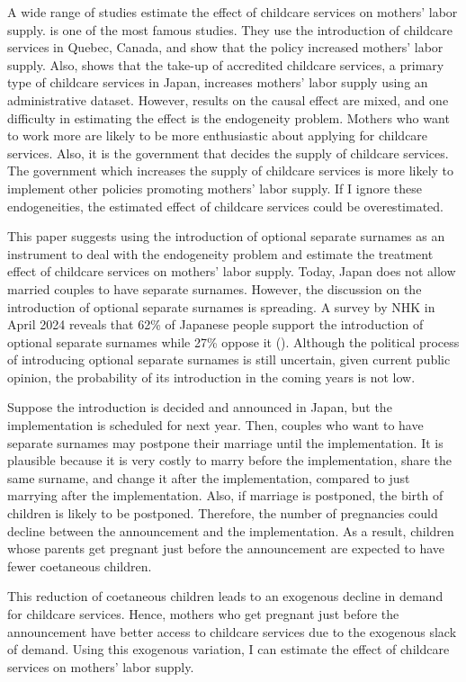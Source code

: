 \documentclass[12pt]{article}
\begin{document}
A wide range of studies estimate the effect of childcare services on mothers' labor supply.
\cite{Baker2008-vt} is one of the most famous studies. 
They use the introduction of childcare services in Quebec, Canada, and show that the policy increased mothers' labor supply.
Also, \cite{kondo2024} shows that the take-up of accredited childcare services, a primary type of childcare services in Japan, increases mothers' labor supply using an administrative dataset.
However, results on the causal effect are mixed, and one difficulty in estimating the effect is the endogeneity problem.
Mothers who want to work more are likely to be more enthusiastic about applying for childcare services.
Also, it is the government that decides the supply of childcare services. 
The government which increases the supply of childcare services is more likely to implement other policies promoting mothers' labor supply.
If I ignore these endogeneities, the estimated effect of childcare services could be overestimated.


This paper suggests using the introduction of optional separate surnames as an instrument to deal with the endogeneity problem and estimate the treatment effect of childcare services on mothers' labor supply.
Today, Japan does not allow married couples to have separate surnames.
However, the discussion on the introduction of optional separate surnames is spreading.
A survey by NHK in April 2024 reveals that 62\% of Japanese people support the introduction of optional separate surnames while 27\% oppose it (\cite{nhk}).
Although the political process of introducing optional separate surnames is still uncertain, given current public opinion, the probability of its introduction in the coming years is not low.


Suppose the introduction is decided and announced in Japan, but the implementation is scheduled for next year.
Then, couples who want to have separate surnames may postpone their marriage until the implementation. 
It is plausible because it is very costly to marry before the implementation, share the same surname, and change it after the implementation, compared to just marrying after the implementation.
Also, if marriage is postponed, the birth of children is likely to be postponed.
Therefore, the number of pregnancies could decline between the announcement and the implementation.
As a result, children whose parents get pregnant just before the announcement are expected to have fewer coetaneous children.


This reduction of coetaneous children leads to an exogenous decline in demand for childcare services.
Hence, mothers who get pregnant just before the announcement have better access to childcare services due to the exogenous slack of demand.
Using this exogenous variation, I can estimate the effect of childcare services on mothers' labor supply. 
\end{document}
